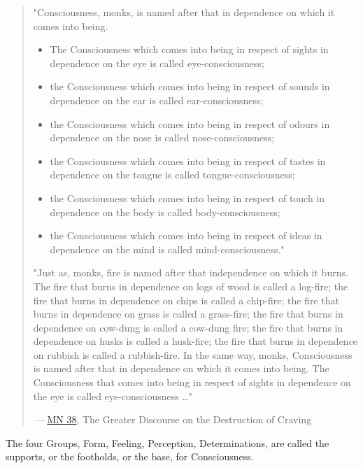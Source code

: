 \begin{quote}
"Consciousness, monks, is named after that in dependence on which it comes into being.

\begin{itemize}
\item
  The Consciousness which comes into being in respect of sights in dependence on the eye is called eye-consciousness;
\item
  the Consciousness which comes into being in respect of sounds in dependence on the ear is called ear-consciousness;
\item
  the Consciousness which comes into being in respect of odours in dependence on the nose is called nose-consciousness;
\item
  the Consciousness which comes into being in respect of tastes in dependence on the tongue is called tongue-consciousness;
\item
  the Consciousness which comes into being in respect of touch in dependence on the body is called body-consciousness;
\item
  the Consciousness which comes into being in respect of ideas in dependence on the mind is called mind-consciousness."
\end{itemize}

"Just as, monks, fire is named after that independence on which it burns. The fire that burns in dependence on logs of wood is called a log-fire; the fire that burns in dependence on chips is called a chip-fire; the fire that burns in dependence on grass is called a grass-fire; the fire that burns in dependence on cow-dung is called a cow-dung fire; the fire that burns in dependence on husks is called a husk-fire; the fire that burns in dependence on rubbish is called a rubbish-fire. In the same way, monks, Consciousness is named after that in dependence on which it comes into being. The Consciousness that comes into being in respect of sights in dependence on the eye is called eye-consciousness \ldots"

 --- \href{https://suttacentral.net/mn38/en/bodhi}{MN 38}, The Greater Discourse on the Destruction of Craving
\end{quote}

The four Groups, Form, Feeling, Perception, Determinations, are called the supports, or the footholds, or the base, for Consciousness.

